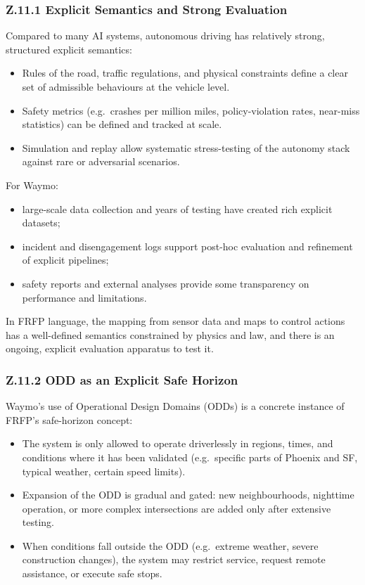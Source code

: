 \subsubsection*{Z.11.1 Explicit Semantics and Strong Evaluation}

Compared to many AI systems, autonomous driving has relatively strong,
structured explicit semantics:

\begin{itemize}
  \item Rules of the road, traffic regulations, and physical constraints
        define a clear set of admissible behaviours at the vehicle level.
  \item Safety metrics (e.g.\ crashes per million miles, policy-violation
        rates, near-miss statistics) can be defined and tracked at scale.
  \item Simulation and replay allow systematic stress-testing of the
        autonomy stack against rare or adversarial scenarios.
\end{itemize}

For Waymo:

\begin{itemize}
  \item large-scale data collection and years of testing have created rich
        explicit datasets; 
  \item incident and disengagement logs support post-hoc evaluation and
        refinement of explicit pipelines;
  \item safety reports and external analyses provide some transparency on
        performance and limitations.
\end{itemize}

In FRFP language, the mapping from sensor data and maps to control actions
has a well-defined semantics constrained by physics and law, and there is an
ongoing, explicit evaluation apparatus to test it.

\subsubsection*{Z.11.2 ODD as an Explicit Safe Horizon}

Waymo’s use of Operational Design Domains (ODDs) is a concrete instance of
FRFP’s safe-horizon concept:

\begin{itemize}
  \item The system is only allowed to operate driverlessly in regions,
        times, and conditions where it has been validated (e.g.\ specific
        parts of Phoenix and SF, typical weather, certain speed limits).
  \item Expansion of the ODD is gradual and gated:
        new neighbourhoods, nighttime operation, or more complex
        intersections are added only after extensive testing.
  \item When conditions fall outside the ODD (e.g.\ extreme weather,
        severe construction changes), the system may restrict service,
        request remote assistance, or execute safe stops.
\end{itemize}

